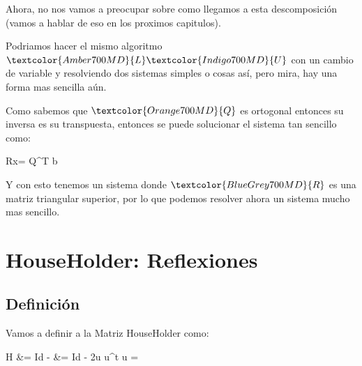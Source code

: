 \documentclass[12pt, fleqn]{report}                             %
\def \Eq {equation}                                             %
\newenvironment{MultiLineEquation*}[1]                          %
        {\begin{\Eq*}\begin{alignedat}{#1}}                         %
        {\end{alignedat}\end{\Eq*}}                                 %
\newenvironment{largeEq} {\begingroup \large}{\endgroup}        %
\newenvironment{LargeEq} {\begingroup \Large}{\endgroup}        %
\DeclareMathOperator \Space     {\quad}                         %
\theoremstyle{break}                                            %
\newcommand{\Abs}[1]    {\left\lVert #1 \right\lVert}           %
\newcommand{\Color}[2]{\textcolor{#1}{#2}}                      %
\newcommand \ColorVecX          {Green700MD}                    %
\newcommand \ColorVecB          {Red700MD}                      %
\newcommand \ColorMatrixL       {Amber700MD}                    %
\newcommand \ColorMatrixU       {Indigo700MD}                   %
\newcommand \ColorMatrixQ       {Orange700MD}                   %
\newcommand \ColorMatrixR       {BlueGrey700MD}                 %
\newcommand \VecX         {\Color{\ColorVecX}{\vec x}}          %
\newcommand \VecB         {\Color{\ColorVecB}{\vec b}}          %
\newcommand \MatrixL      {\Color{\ColorMatrixL}{L}}            %
\newcommand \MatrixU      {\Color{\ColorMatrixU}{U}}            %
\newcommand \MatrixQ      {\Color{\ColorMatrixQ}{Q}}            %
\newcommand \MatrixR      {\Color{\ColorMatrixR}{R}}            %
\begin{document}
            Ahora, no nos vamos a preocupar sobre como llegamos a esta descomposición (vamos a hablar de eso
            en los proximos capitulos).

            Podriamos hacer el mismo algoritmo $\MatrixL \MatrixU$ con un cambio de variable y resolviendo dos
            sistemas simples o cosas así, pero mira, hay una forma mas sencilla aún.

            Como sabemos que $\MatrixQ$ es ortogonal entonces su inversa es su transpuesta, entonces
            se puede solucionar el sistema tan sencillo como:
            \begin{LargeEq}
                \begin{MultiLineEquation*}{3}
                    \MatrixR \VecX = \Color{\ColorMatrixQ}{\MatrixQ^T} \VecB               
                \end{MultiLineEquation*}
            \end{LargeEq}

            Y con esto tenemos un sistema donde $\MatrixR$ es una matriz triangular superior, por lo que podemos
            resolver ahora un sistema mucho mas sencillo.



    \chapter{HouseHolder: Reflexiones}

        \clearpage
        \section{Definición}

            Vamos a definir a la Matriz HouseHolder como:
            \begin{largeEq}
                \begin{MultiLineEquation*}{3}
                    H
                        &= Id - \frac{2(v v^t)}{\Abs{v}^2} \;                                   
                        &= Id - 2u u^t \Space {} u = \frac{\vec v}{\Abs{\vec v}}
                \end{MultiLineEquation*}
            \end{largeEq}
\end{document}

